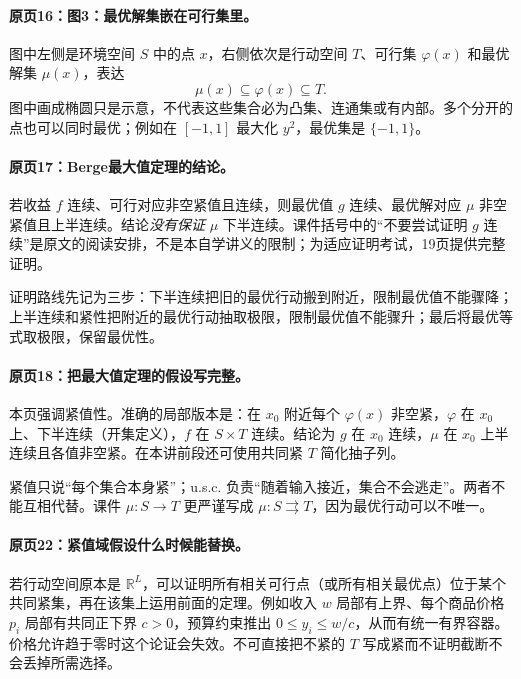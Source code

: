 \documentclass[11pt,a4paper]{article}
\newcommand{\R}{\mathbb{R}}\newcommand{\N}{\mathbb{N}}
\theoremstyle{definition}\newtheorem{definition}{定义}\newtheorem{example}{例}
\begin{document}
\paragraph{原页16：图3：最优解集嵌在可行集里。}图中左侧是环境空间 $S$ 中的点 $x$，右侧依次是行动空间 $T$、可行集 $\varphi(x)$ 和最优解集 $\mu(x)$，表达
\[\mu(x)\subseteq\varphi(x)\subseteq T.\]
图中画成椭圆只是示意，不代表这些集合必为凸集、连通集或有内部。多个分开的点也可以同时最优；例如在 $[-1,1]$ 最大化 $y^2$，最优集是 $\{-1,1\}$。



\paragraph{原页17：Berge最大值定理的结论。}若收益 $f$ 连续、可行对应非空紧值且连续，则最优值 $g$ 连续、最优解对应 $\mu$ 非空紧值且上半连续。结论\emph{没有保证} $\mu$ 下半连续。课件括号中的“不要尝试证明 $g$ 连续”是原文的阅读安排，不是本自学讲义的限制；为适应证明考试，19页提供完整证明。

证明路线先记为三步：下半连续把旧的最优行动搬到附近，限制最优值不能骤降；上半连续和紧性把附近的最优行动抽取极限，限制最优值不能骤升；最后将最优等式取极限，保留最优性。



\paragraph{原页18：把最大值定理的假设写完整。}本页强调紧值性。准确的局部版本是：在 $x_0$ 附近每个 $\varphi(x)$ 非空紧，$\varphi$ 在 $x_0$ 上、下半连续（开集定义），$f$ 在 $S\times T$ 连续。结论为 $g$ 在 $x_0$ 连续，$\mu$ 在 $x_0$ 上半连续且各值非空紧。在本讲前段还可使用共同紧 $T$ 简化抽子列。

紧值只说“每个集合本身紧”；u.s.c. 负责“随着输入接近，集合不会逃走”。两者不能互相代替。课件 $\mu:S\to T$ 更严谨写成 $\mu:S\rightrightarrows T$，因为最优行动可以不唯一。



\paragraph{原页22：紧值域假设什么时候能替换。}若行动空间原本是 $\R^L$，可以证明所有相关可行点（或所有相关最优点）位于某个共同紧集，再在该集上运用前面的定理。例如收入 $w$ 局部有上界、每个商品价格 $p_i$ 局部有共同正下界 $c>0$，预算约束推出 $0\le y_i\le w/c$，从而有统一有界容器。价格允许趋于零时这个论证会失效。不可直接把不紧的 $T$ 写成紧而不证明截断不会丢掉所需选择。
\end{document}
